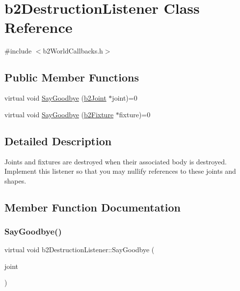 \hypertarget{classb2DestructionListener}{}\section{b2\+Destruction\+Listener Class Reference}
\label{classb2DestructionListener}


{\ttfamily \#include $<$b2\+World\+Callbacks.\+h$>$}

\subsection*{Public Member Functions}
\begin{DoxyCompactItemize}
\item 
virtual void \mbox{\hyperlink{classb2DestructionListener_a6cd15baa6e5c33118cf7173ab5bf6d58}{Say\+Goodbye}} (\mbox{\hyperlink{classb2Joint}{b2\+Joint}} $\ast$joint)=0
\item 
virtual void \mbox{\hyperlink{classb2DestructionListener_ab327c0073d162112c38d2fe8f8b9fce3}{Say\+Goodbye}} (\mbox{\hyperlink{classb2Fixture}{b2\+Fixture}} $\ast$fixture)=0
\end{DoxyCompactItemize}


\subsection{Detailed Description}
Joints and fixtures are destroyed when their associated body is destroyed. Implement this listener so that you may nullify references to these joints and shapes. 

\subsection{Member Function Documentation}
\mbox{\label{classb2DestructionListener_a6cd15baa6e5c33118cf7173ab5bf6d58}} 
\subsubsection{\texorpdfstring{Say\+Goodbye()}{SayGoodbye()}\hspace{0.1cm}{\footnotesize\ttfamily [1/2]}}
{\footnotesize\ttfamily virtual void b2\+Destruction\+Listener\+::\+Say\+Goodbye (\begin{DoxyParamCaption}\item[{\mbox{\hyperlink{classb2Joint}{b2\+Joint}} $\ast$}]{joint }\end{DoxyParamCaption})\hspace{0.3cm}{\ttfamily [pure virtual]}}

